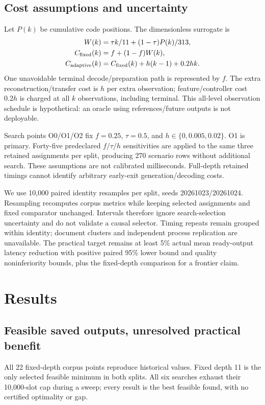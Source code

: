 \documentclass[11pt]{article}
\begin{document}
\subsection{Cost assumptions and uncertainty}
Let $P(k)$ be cumulative code positions. The dimensionless surrogate is
\begin{align}
W(k)&=\tau k/11+(1-\tau)P(k)/313,\\
C_{\rm fixed}(k)&=f+(1-f)W(k),\\
C_{\rm adaptive}(k)&=C_{\rm fixed}(k)+h(k-1)+0.2hk.
\end{align}
One unavoidable terminal decode/preparation path is represented by $f$. The extra reconstruction/transfer cost is $h$ per extra observation; feature/controller cost $0.2h$ is charged at all $k$ observations, including terminal. This all-level observation schedule is hypothetical: an oracle using references/future outputs is not deployable.

Search points O0/O1/O2 fix $f=0.25$, $\tau=0.5$, and $h\in\{0,0.005,0.02\}$. O1 is primary. Forty-five predeclared $f/\tau/h$ sensitivities are applied to the same three retained assignments per split, producing 270 scenario rows without additional search. These assumptions are not calibrated milliseconds. Full-depth retained timings cannot identify arbitrary early-exit generation/decoding costs.

We use 10,000 paired identity resamples per split, seeds 20261023/20261024. Resampling recomputes corpus metrics while keeping selected assignments and fixed comparator unchanged. Intervals therefore ignore search-selection uncertainty and do not validate a causal selector. Timing repeats remain grouped within identity; document clusters and independent process replication are unavailable. The practical target remains at least 5\% actual mean ready-output latency reduction with positive paired 95\% lower bound and quality noninferiority bounds, plus the fixed-depth comparison for a frontier claim.

\section{Results}
\subsection{Feasible saved outputs, unresolved practical benefit}
All 22 fixed-depth corpus points reproduce historical values. Fixed depth 11 is the only selected feasible minimum in both splits. All six searches exhaust their 10,000-slot cap during a sweep; every result is the best feasible found, with no certified optimality or gap.
\end{document}
